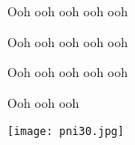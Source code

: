 \outro{}
\begin{chorus*}
  Ooh ooh ooh ooh ooh 

  Ooh ooh ooh ooh ooh

  Ooh ooh ooh ooh ooh

  Ooh ooh ooh
\end{chorus*}

\vfill
\begin{center}
 \texttt{[image: pni30.jpg]}
\end{center}
\vfill